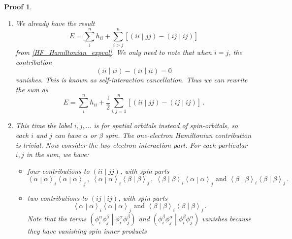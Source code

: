 \documentclass{article}
\theoremstyle{plain}\theoremheaderfont{\normalfont\itshape}\theorembodyfont{\rmfamily}\theoremseparator{.}\newtheorem*{rem}{Remark}\newtheorem*{ex}{Example}\newtheorem*{proof}{Proof}\newtheorem*{altp}{Alternative proof}
\theoremstyle{plain}\theoremheaderfont{\normalfont\bfseries}\theorembodyfont{\rmfamily}\theoremseparator{.}\newtheorem{thm}{Theorem}[section]\newtheorem{lem}[thm]{Lemma}\newtheorem{prop}[thm]{Proposition}\newtheorem*{cor}{Corollary}\newtheorem{defn}[thm]{Definition}\newtheorem{clm}[thm]{Claim}\newtheorem{clminproof}{Claim}
\theoremstyle{break}\theoremheaderfont{\normalfont\itshape}\theorembodyfont{\rmfamily}\theoremseparator{.\medskip}\newtheorem*{proofskip}{Proof}\newtheorem*{exs}{Examples}\newtheorem*{rems}{Remarks}
\theoremstyle{break}\theoremheaderfont{\normalfont\bfseries}\theorembodyfont{\rmfamily}\theoremseparator{.\medskip}\newtheorem{lemskip}[thm]{Lemma}\newtheorem{defnskip}[thm]{Definition}\newtheorem{propskip}[thm]{Proposition}\newtheorem{thmskip}[thm]{Theorem}
\numberwithin{equation}{section}
\newcommand{\braket}[2]{\left\langle #1 \middle| #2 \right\rangle}
\newcommand{\bracket}[2]{\left( #1 \middle| #2 \right)}
\begin{document}
    \begin{proofskip}
        \begin{enumerate}[topsep=0pt,label=(\roman*)]
            \item We already have the result
            \begin{equation}
                E=\sum_{i}^{n}h_{ii}+\sum_{i>j}^{n}[\bracket{ii}{jj}-\bracket{ij}{ij}]
            \end{equation}
            from \cref{HF_Hamiltonian_expval}. We only need to note that when \(i=j\), the contribution
            \begin{equation}
                \bracket{ii}{ii}-\bracket{ii}{ii}=0
            \end{equation}
            vanishes. This is known as \textit{self-interaction cancellation}. Thus we can rewrite the sum as
            \begin{equation}\label{HF_general_energy}
                E=\sum_{i}^{n}h_{ii}+\frac{1}{2}\sum_{i,j=1}^{n}[\bracket{ii}{jj}-\bracket{ij}{ij}]\,.
            \end{equation}
            \item This time the label \(i,j,\dots\) is for spatial orbitals instead of spin-orbitals, so each \(i\) and \(j\) can have \(\alpha\) or \(\beta\) spin. The one-electron Hamiltonian contribution is trivial. Now consider the two-electron interaction part. For each particular \(i,j\) in the sum, we have:
            \begin{itemize}
                \item four contributions to \(\bracket{ii}{jj}\), with spin parts
                \begin{equation}
                    \braket{\alpha}{\alpha}_i\braket{\alpha}{\alpha}_j\,,\;\braket{\alpha}{\alpha}_i\braket{\beta}{\beta}_j\,,\;\braket{\beta}{\beta}_i\braket{\alpha}{\alpha}_j\text{ and }\braket{\beta}{\beta}_i\braket{\beta}{\beta}_j\,.
                \end{equation}
                \item two contributions to \(\bracket{ij}{ij}\), with spin parts
                \begin{equation}
                    \braket{\alpha}{\alpha}_i\braket{\alpha}{\alpha}_j\text{ and }\braket{\beta}{\beta}_i\braket{\beta}{\beta}_j\,.
                \end{equation}
                Note that the terms \(\bracket{\phi_i^\alpha\phi_j^\beta}{\phi_i^\alpha\phi_j^\beta}\) and \(\bracket{\phi_i^\beta\phi_j^\alpha}{\phi_i^\beta\phi_j^\alpha}\) vanishes because they have vanishing spin inner products

\end{itemize}
\end{enumerate}
\end{proofskip}
\end{document}
